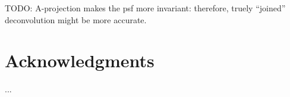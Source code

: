 \documentclass[useAMS,usenatbib]{mn2e}
\DeclareRobustCommand{\TUSSEN}[3]{#2}
\begin{document}
TODO: A-projection makes the psf more invariant: therefore, truely ``joined'' deconvolution might be more accurate.

\section*{Acknowledgments}
...

\DeclareRobustCommand{\TUSSEN}[3]{#3}




\label{lastpage}
\end{document}
